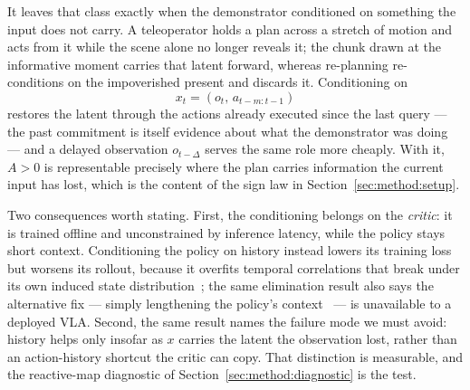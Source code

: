 It leaves that class exactly when the demonstrator conditioned on something the input does not carry.
A teleoperator holds a plan across a stretch of motion and acts from it while the scene alone no longer
reveals it; the chunk drawn at the informative moment carries that latent forward, whereas re-planning
re-conditions on the impoverished present and discards it. Conditioning on
\begin{equation}
\label{eq:rcv-input}
x_t=(o_t,\, a_{t-m:t-1})
\end{equation}
restores the latent through the actions already executed since the last query --- the past commitment
is itself evidence about what the demonstrator was doing --- and a delayed observation $o_{t-\Delta}$
serves the same role more cheaply. With it, $A>0$ is representable precisely where the plan carries
information the current input has lost, which is the content of the sign law in
Section~\ref{sec:method:setup}.

Two consequences worth stating. First, the conditioning belongs on the \emph{critic}: it is trained
offline and unconstrained by inference latency, while the policy stays short context. Conditioning the
policy on history instead lowers its training loss but worsens its rollout, because it overfits temporal
correlations that break under its own induced state distribution~\citep{park-bc-mystery}; the same
elimination result also says the alternative fix --- simply lengthening the policy's
context~\citep{zeng2026openloop} --- is unavailable to a deployed VLA. Second, the same result names the
failure mode we must avoid: history helps only insofar as $x$ carries the latent the observation lost,
rather than an action-history shortcut the critic can copy. That distinction is measurable, and the
reactive-map diagnostic of Section~\ref{sec:method:diagnostic} is the test.

